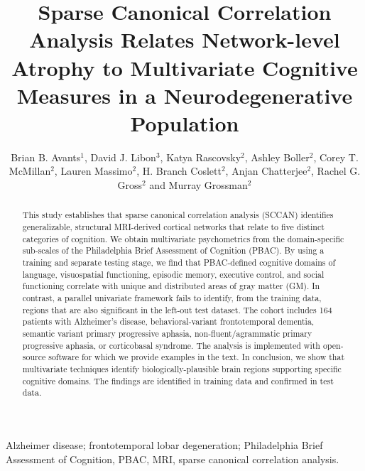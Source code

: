 \documentclass[preprint,authoryear,12pt]{elsarticle}
\begin{document}
\title{Sparse Canonical Correlation Analysis Relates Network-level Atrophy 
to Multivariate Cognitive Measures in a Neurodegenerative Population}
\author{Brian B. Avants$^1$, David J. Libon$^3$, Katya Rascovsky$^2$, Ashley Boller$^2$, Corey T. McMillan$^2$, Lauren Massimo$^2$, H. Branch Coslett$^2$, Anjan Chatterjee$^2$, Rachel G. Gross$^2$ and Murray Grossman$^2$}
\address{Departments of Radiology$^1$ and Neurology$^2$,\newline University of Pennsylvania School of Medicine, Philadelphia, PA \newline 
Department of Neurology$^3$, Drexel University College of Medicine, Philadelphia, PA.}
\begin{abstract}
This study establishes that sparse canonical correlation analysis (SCCAN) identifies generalizable, structural MRI-derived cortical networks that relate to five distinct categories of cognition.  We obtain multivariate psychometrics from the domain-specific sub-scales of the Philadelphia Brief Assessment of Cognition (PBAC).  By using a training and separate testing stage, we find that PBAC-defined cognitive domains of language, visuospatial functioning, episodic memory, executive control, and social functioning correlate with unique and distributed areas of gray matter (GM).  In contrast, a parallel univariate framework fails to identify, from the training data, regions that are also significant in the left-out test dataset. The cohort includes 164 patients with Alzheimer's disease, behavioral-variant frontotemporal dementia, semantic variant primary progressive aphasia, non-fluent/agrammatic primary progressive aphasia, or corticobasal syndrome.  The analysis is implemented with open-source software for which we provide examples in the text.  In conclusion, we show that multivariate techniques identify biologically-plausible brain regions supporting specific cognitive domains.  The findings are identified in training data and confirmed in test data. 
\end{abstract}
\begin{keyword}
Alzheimer disease; frontotemporal lobar degeneration; Philadelphia Brief Assessment of Cognition, PBAC, MRI, sparse canonical correlation analysis.
\end{keyword}
\maketitle

\end{document}
